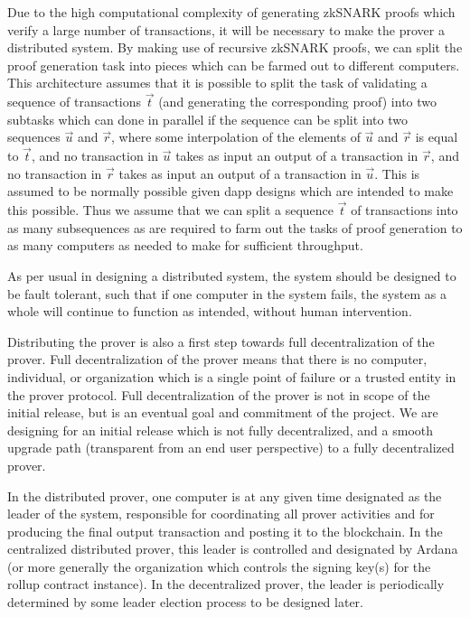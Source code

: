 \documentclass[12pt]{article}
\begin{document}
Due to the high computational complexity of generating zkSNARK proofs which verify a large number of transactions, it will be necessary to make the prover a distributed system. By making use of recursive zkSNARK proofs, we can split the proof generation task into pieces which can be farmed out to different computers. This architecture assumes that it is possible to split the task of validating a sequence of transactions $\vec{t}$ (and generating the corresponding proof) into two subtasks which can done in parallel if the sequence can be split into two sequences $\vec{u}$ and $\vec{r}$, where some interpolation of the elements of $\vec{u}$ and $\vec{r}$ is equal to $\vec{t}$, and no transaction in $\vec{u}$ takes as input an output of a transaction in $\vec{r}$, and no transaction in $\vec{r}$ takes as input an output of a transaction in $\vec{u}$. This is assumed to be normally possible given dapp designs which are intended to make this possible. Thus we assume that we can split a sequence $\vec{t}$ of transactions into as many subsequences as are required to farm out the tasks of proof generation to as many computers as needed to make for sufficient throughput.

As per usual in designing a distributed system, the system should be designed to be fault tolerant, such that if one computer in the system fails, the system as a whole will continue to function as intended, without human intervention.

Distributing the prover is also a first step towards full decentralization of the prover. Full decentralization of the prover means that there is no computer, individual, or organization which is a single point of failure or a trusted entity in the prover protocol. Full decentralization of the prover is not in scope of the initial release, but is an eventual goal and commitment of the project. We are designing for an initial release which is not fully decentralized, and a smooth upgrade path (transparent from an end user perspective) to a fully decentralized prover.

In the distributed prover, one computer is at any given time designated as the leader of the system, responsible for coordinating all prover activities and for producing the final output transaction and posting it to the blockchain. In the centralized distributed prover, this leader is controlled and designated by Ardana (or more generally the organization which controls the signing key(s) for the rollup contract instance). In the decentralized prover, the leader is periodically determined by some leader election process to be designed later.
\end{document}
